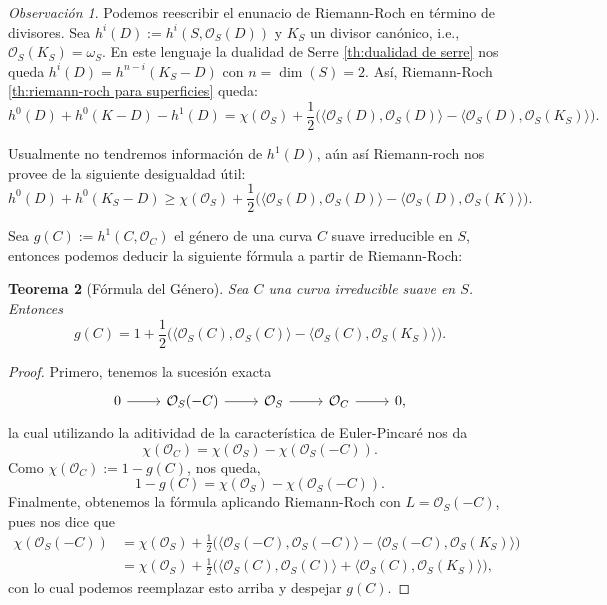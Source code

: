 \documentclass[spanish,12pt]{amsart}
\newtheorem{theorem}{Teorema}[section]
\theoremstyle{definition}
\theoremstyle{remark}
\newtheorem{remark}[theorem]{Observación}
\numberwithin{equation}{section}
\renewcommand{\O}{\mathcal{O}}
\begin{document}
\begin{remark}
Podemos reescribir el enunacio de Riemann-Roch en término de divisores. Sea $h^i (D) := h^i(S, \O_S (D))$ y $K_S$ un divisor canónico, i.e., $\O_S (K_S) = \omega_S$. En este lenguaje la dualidad de Serre \ref{th:dualidad de serre} nos queda $h^i (D) = h^{n-i} (K_S - D)$ con $n = \dim (S) = 2$. Así, Riemann-Roch \ref{th:riemann-roch para superficies} queda:
\[
    h^0 (D) + h^0 (K-D) - h^1 (D) = \chi (\O_S) + \frac 1 2 \big ( \langle \O_S (D), \O_S (D) \rangle - \langle \O_S (D), \O_S (K_S) \rangle \big ).
\]

Usualmente no tendremos información de $h^1 (D)$, aún así Riemann-roch nos provee de la siguiente desigualdad útil:
\[
    h^0 (D) + h^0 (K_S - D) \geq \chi (\O_S) + \frac 1 2 \big ( \langle \O_S (D), \O_S (D) \rangle  - \langle  \O_S (D), \O_S (K)\rangle  \big ).
\]
\end{remark}

Sea $g(C) := h^1 (C, \O_C)$ el género de una curva $C$ suave irreducible en $S$, entonces podemos deducir la siguiente fórmula a partir de Riemann-Roch:
\begin{theorem}[Fórmula del Género]\label{th:formula del genero}
Sea $C$ una curva irreducible suave en $S$. Entonces
\[
    g(C) = 1 + \frac 1 2 \big ( \langle \O_S (C), \O_S (C) \rangle  - \langle \O_S (C), \O_S (K_S) \rangle  \big ).
\]
\end{theorem}
\begin{proof}
Primero, tenemos la sucesión exacta
\[
    \begin{tikzcd}
    0 \ar{r} & \O_S (-C) \ar{r} & \O_S \ar{r} & \O_C \ar{r} & 0,
    \end{tikzcd}
\]
la cual utilizando la aditividad de la característica de Euler-Pincaré nos da
\[
    \chi (\O_C) = \chi (\O_S) - \chi (\O_S (-C)).
\]
Como $ \chi (\O_C ) := 1 - g(C)$, nos queda,
\[
    1 - g(C) = \chi (\O_S) - \chi (\O_S (-C)).
\]
Finalmente, obtenemos la fórmula aplicando Riemann-Roch con $L = \O_S (-C)$, pues nos dice que
\begin{align*}
    \chi (\O_S (-C)) &= \chi (\O_S) + \frac 1 2 \big ( \langle \O_S (-C), \O_S (-C) \rangle - \langle \O_S (-C), \O_S (K_S) \rangle \big) \\
    &= \chi (\O_S) + \frac 1 2 \big ( \langle \O _S (C), \O_S (C)\rangle + \langle \O_S (C), \O_S (K_S) \rangle  \big ),
\end{align*}
con lo cual podemos reemplazar esto arriba y despejar $g(C)$.
\end{proof}
\end{document}
